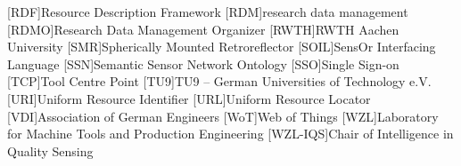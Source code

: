 \begin{acronym}[JSONP]
[RDF]{Resource Description Framework}
[RDM]{research data management}
[RDMO]{Research Data Management Organizer}
[RWTH]{RWTH Aachen University}
[SMR]{Spherically Mounted Retroreflector}
[SOIL]{SensOr Interfacing Language}
[SSN]{Semantic Sensor Network Ontology}
[SSO]{Single Sign-on}
[TCP]{Tool Centre Point}
[TU9]{TU9 – German Universities of Technology e.V.}
[URI]{Uniform Resource Identifier}
[URL]{Uniform Resource Locator}
[VDI]{Association of German Engineers}
[WoT]{Web of Things}
[WZL]{Laboratory for Machine Tools and Production Engineering}
[WZL-IQS]{Chair of Intelligence in Quality Sensing}
\end{acronym}


